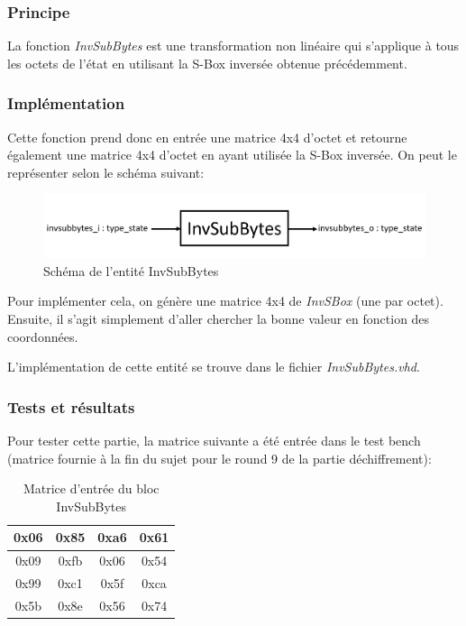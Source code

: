 \documentclass[a4paper, 12pt]{article}
\begin{document}
		\subsubsection{Principe}
	La fonction \emph{InvSubBytes} est une transformation non linéaire qui s'applique à tous les octets de l'état en utilisant la S-Box inversée obtenue précédemment. 	
		\subsubsection{Implémentation}
	Cette fonction prend donc en entrée une matrice 4x4 d'octet et retourne également une matrice 4x4 d'octet en ayant utilisée la S-Box inversée. On peut le représenter selon le schéma suivant:
		\begin{figure}[H]
			\begin{center}
			\includegraphics[scale=0.4]{Images/InvSubBytesEntity.png}
			\end{center}
			\caption{Schéma de l'entité InvSubBytes}
			\label{InvSubBytesEntity}
		\end{figure}
	Pour implémenter cela, on génère une matrice 4x4 de \emph{InvSBox} (une par octet). Ensuite, il s'agit simplement d'aller chercher la bonne valeur en fonction des coordonnées.
	
	L'implémentation de cette entité se trouve dans le fichier \emph{InvSubBytes.vhd}.
		\subsubsection{Tests et résultats}
		Pour tester cette partie, la matrice suivante a été entrée dans le test bench (matrice fournie à la fin du sujet pour le round 9 de la partie déchiffrement): \\
			\begin{table}[H]
				\begin{center}
				\begin{tabular}{|c|c|c|c|}
					\hline
					0x06 & 0x85 & 0xa6 & 0x61 \\
					\hline
					0x09 & 0xfb & 0x06 & 0x54 \\
					\hline
					0x99 & 0xc1 & 0x5f & 0xca \\
					\hline
					0x5b & 0x8e & 0x56 & 0x74 \\
					\hline
				\end{tabular}
				\caption{Matrice d'entrée du bloc InvSubBytes}
				\label{MatriceEntreeInvSubBytes}
				\end{center}
			\end{table}
			
\end{document}
